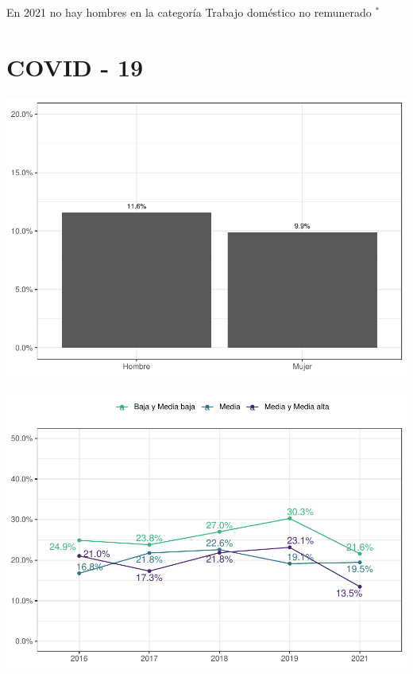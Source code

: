 \documentclass[
  12pt,
]{book}
\begin{document}
En 2021 no hay hombres en la categoría Trabajo doméstico no remunerado \(^{*}\)

\hypertarget{covid---19}{%
\section{COVID - 19}\label{covid---19}}

\begin{center}\includegraphics{reporte-elsoc_files/figure-latex/covid-sexo-1} \end{center}

\begin{center}\includegraphics{reporte-elsoc_files/figure-latex/depre clase.sub-1} \end{center}
\end{document}
